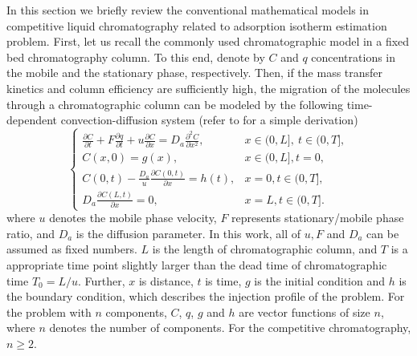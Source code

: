 \documentclass[thmsa,onecolumn,12pt]{article}%
\begin{document}
In this section we briefly review the conventional mathematical models in competitive liquid chromatography related to adsorption isotherm estimation problem. First, let us recall the commonly used chromatographic model in a fixed bed chromatography column. To this end, denote by $C$ and $q$ concentrations in the mobile and the stationary phase, respectively. Then, if the mass transfer kinetics and column efficiency are sufficiently high, the migration of the molecules through a chromatographic column can be modeled by the  following time-dependent convection-diffusion system (refer to \cite{LinZhang2018} for a simple derivation)
\begin{equation}\label{eq:prime}
\left\{\begin{array}{ll}
\frac{\partial C}{\partial t}+F\frac{\partial q}{\partial t}+u\frac{\partial C}{\partial x}=D_{a}\frac{\partial^{2} C}{\partial x^{2}}, & x\in (0,L],~ t\in (0,T], \\
C(x,0)=g(x),& x\in (0,L], t=0, \\
C(0,t)-\frac{D_{a}}{u}\frac{\partial C(0,t)}{\partial x}=h(t), & x=0, t\in (0,T],\\
D_{a}\frac{\partial C(L,t)}{\partial x}=0,& x=L, t\in (0,T].
\end{array}\right.
\end{equation}
where $u$ denotes the mobile phase velocity, $F$ represents stationary/mobile phase ratio, and $D_{a}$ is the diffusion parameter. In this work, all of $u, F$ and $D_{a}$ can be assumed as fixed numbers. $L$ is the length of chromatographic column, and $T$ is a appropriate time point slightly larger than the dead time of chromatographic time $T_0 = L/u$. Further, $x$ is distance, $t$ is time, $g$ is the initial condition and $h$ is the boundary condition, which describes the injection profile of the problem. For the problem with $n$ components, $C$, $q$, $g$ and $h$ are vector functions of size $n$, where $n$ denotes the number of components. For the competitive chromatography, $n\geq2$.
\end{document}
